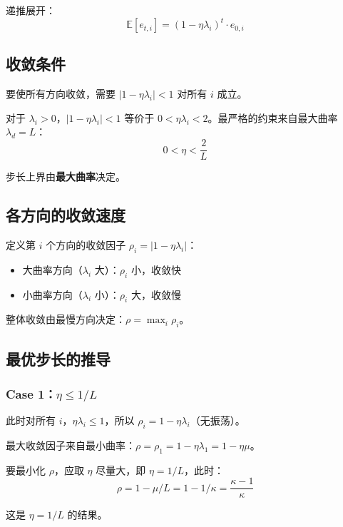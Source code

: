 \documentclass[12pt, a4paper]{ctexart}
\begin{document}
递推展开：
\begin{equation}
    \boxed{\mathbb{E}[e_{t,i}] = (1 - \eta\lambda_i)^t \cdot e_{0,i}}
\end{equation}

\subsection{收敛条件}

要使所有方向收敛，需要 $|1 - \eta\lambda_i| < 1$ 对所有 $i$ 成立。

对于 $\lambda_i > 0$，$|1 - \eta\lambda_i| < 1$ 等价于 $0 < \eta\lambda_i < 2$。最严格的约束来自最大曲率 $\lambda_d = L$：
\begin{equation}
    \boxed{0 < \eta < \frac{2}{L}}
\end{equation}

步长上界由\textbf{最大曲率}决定。

\subsection{各方向的收敛速度}

定义第 $i$ 个方向的收敛因子 $\rho_i = |1 - \eta\lambda_i|$：
\begin{itemize}
    \item 大曲率方向（$\lambda_i$ 大）：$\rho_i$ 小，收敛快
    \item 小曲率方向（$\lambda_i$ 小）：$\rho_i$ 大，收敛慢
\end{itemize}

整体收敛由最慢方向决定：$\rho = \max_i \rho_i$。

\subsection{最优步长的推导}

\subsubsection{Case 1：$\eta \leq 1/L$}

此时对所有 $i$，$\eta\lambda_i \leq 1$，所以 $\rho_i = 1 - \eta\lambda_i$（无振荡）。

最大收敛因子来自最小曲率：$\rho = \rho_1 = 1 - \eta\lambda_1 = 1 - \eta\mu$。

要最小化 $\rho$，应取 $\eta$ 尽量大，即 $\eta = 1/L$，此时：
\[
\rho = 1 - \mu/L = 1 - 1/\kappa = \frac{\kappa - 1}{\kappa}
\]

这是 $\eta = 1/L$ 的结果。
\end{document}
